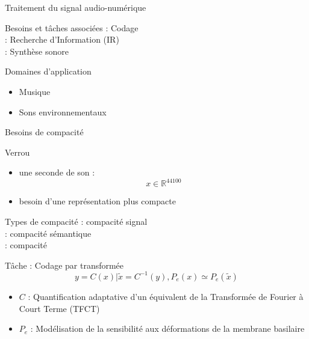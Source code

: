 \begin{frame}{Traitement du signal audio-numérique}
\begin{block}{Besoins et tâches associées}
: Codage \\
: Recherche d'Information (IR) \\
: Synthèse sonore
\end{block}
\begin{block}{Domaines d'application}
\begin{itemize}
\item Musique
\item Sons environnementaux
\end{itemize}
\end{block}
\end{frame}


\begin{frame}{Besoins de compacité}
\begin{block}{Verrou}
\begin{itemize}
\item une seconde de son : $$ x \in \mathbb{R}^{44100}$$
\item besoin d'une représentation plus \alert{compacte}
\end{itemize}
\end{block}
\begin{block}{Types de compacité}
: compacité signal \\ %
: compacité sémantique \\ %
: compacité \alert{\og}  \alert{\fg} \\ %
\end{block}
\end{frame}

\begin{frame}{Tâche : Codage par transformée}
$$y = C(x) | \tilde{x} = C^{-1}(y), P_e(x) \simeq P_e(\tilde{x})$$
\begin{itemize}
\item $C$ : Quantification adaptative d'un équivalent de la Transformée de Fourier à Court Terme (TFCT)
\item $P_e$ : Modélisation de la sensibilité aux déformations de la membrane basilaire
\end{itemize}
\end{frame}

